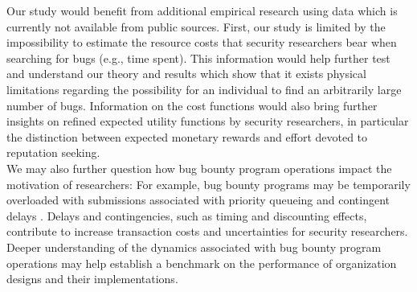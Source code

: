 

Our study would benefit from additional empirical research using data which is currently not available from public sources. First, our study is limited by the impossibility to estimate the resource costs that security researchers bear when searching for bugs (e.g., time spent). This information would help further test and understand our theory and results which show that it exists physical limitations regarding the possibility for an individual to find an arbitrarily large number of bugs. Information on the cost functions would also bring further insights on refined expected utility functions by security researchers, in particular the distinction between expected monetary rewards and effort devoted to reputation seeking.\\

We may also further question how bug bounty program operations impact the motivation of researchers: For example, bug bounty programs may be temporarily overloaded with submissions \cite{zhao2014exploratory,zhao2015empirical} associated with priority queueing and contingent delays \cite{maillart2011quantification}. Delays and contingencies, such as timing and discounting effects, contribute to increase transaction costs and uncertainties for security researchers. Deeper understanding of the dynamics associated with bug bounty program operations may help establish a benchmark on the performance of organization designs and their implementations.\\

